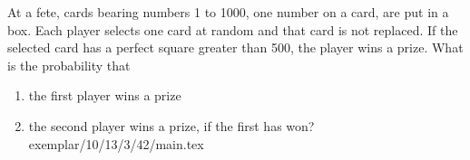 \solution

\item At a fete, cards bearing numbers 1 to 1000, one number
on a card, are put in a box. Each player selects one card
at random and that card is not replaced. If the selected
card has a perfect square greater than 500, the player
wins a prize. What is the probability that
\renewcommand{\labelenumi}{(\roman{enumi})}
\begin{enumerate}
\item the first player wins a prize
\item the second player wins a prize, if the first has won? 
\solution
 {exemplar/10/13/3/42/main.tex}
\end{enumerate}
